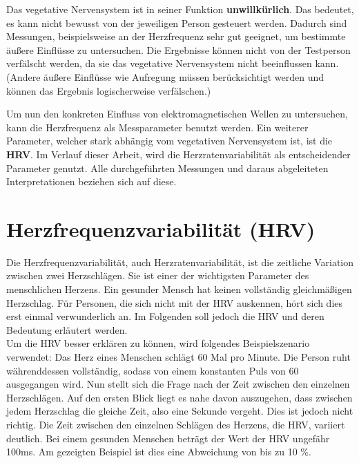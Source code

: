 Das vegetative Nervensystem ist in seiner Funktion \textbf{unwillkürlich}. Das bedeutet, es kann nicht bewusst von der jeweiligen Person gesteuert werden. Dadurch sind Messungen, beispielsweise an der Herzfrequenz sehr gut geeignet, um bestimmte äußere Einflüsse zu untersuchen.
Die Ergebnisse können nicht von der Testperson verfälscht werden, da sie das vegetative Nervensystem nicht beeinflussen kann. (Andere äußere Einflüsse wie Aufregung müssen berücksichtigt werden und können das Ergebnis logischerweise verfälschen.)\cite{veg}
		
Um nun den konkreten Einfluss von elektromagnetischen Wellen zu untersuchen, kann die Herzfrequenz als Messparameter benutzt werden. Ein weiterer Parameter, welcher stark abhängig vom vegetativen Nervensystem ist, ist die \textbf{\ac{HRV}}. Im Verlauf dieser Arbeit, wird die Herzratenvariabilität als entscheidender Parameter genutzt. Alle durchgeführten Messungen und daraus abgeleiteten Interpretationen beziehen sich auf diese. 


\section{Herzfrequenzvariabilität (HRV)}
Die Herzfrequenzvariabilität, auch Herzratenvariabilität, ist die zeitliche Variation zwischen zwei Herzschlägen. Sie ist einer der wichtigsten Parameter des menschlichen Herzens. Ein gesunder Mensch hat keinen vollständig gleichmäßigen Herzschlag. Für Personen, die sich nicht mit der \acs{HRV} auskennen, hört sich dies erst einmal verwunderlich an. Im Folgenden soll jedoch die \acs{HRV} und deren Bedeutung erläutert werden. \\
Um die \acs{HRV} besser erklären zu können, wird folgendes Beispielszenario verwendet: Das Herz eines Menschen schlägt 60 Mal pro Minute. Die Person ruht währenddessen vollständig, sodass von einem konstanten Puls von 60 ausgegangen wird. Nun stellt sich die Frage nach der Zeit zwischen den einzelnen Herzschlägen. Auf den ersten Blick liegt es nahe davon auszugehen, dass zwischen jedem Herzschlag die gleiche Zeit, also eine Sekunde vergeht. Dies ist jedoch nicht richtig. Die Zeit zwischen den einzelnen Schlägen des Herzens, die \acs{HRV},  variiert deutlich.  Bei einem gesunden Menschen beträgt der Wert der \acs{HRV} ungefähr 100ms. Am gezeigten Beispiel ist dies eine Abweichung von bis zu 10 \%.\cite[S.20ff]{babilon}\cite{hrv} \\

